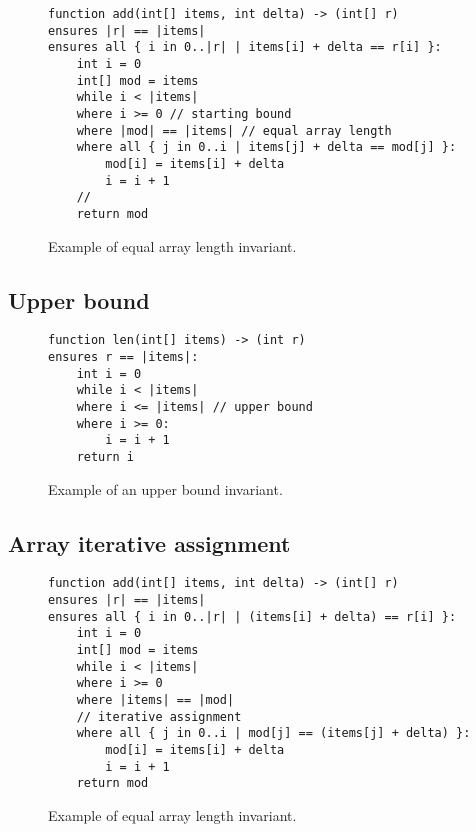 \begin{figure}[ht]
\begin{lstlisting}
function add(int[] items, int delta) -> (int[] r)
ensures |r| == |items|
ensures all { i in 0..|r| | items[i] + delta == r[i] }:
    int i = 0
    int[] mod = items
    while i < |items|
    where i >= 0 // starting bound
    where |mod| == |items| // equal array length
    where all { j in 0..i | items[j] + delta == mod[j] }:
        mod[i] = items[i] + delta
        i = i + 1
    //
    return mod
\end{lstlisting}
\caption{Example of equal array length invariant.}
\label{lst:starting-bound-rev}
\end{figure}

\subsection{Upper bound}



\begin{figure}[ht]
\begin{lstlisting}
function len(int[] items) -> (int r)
ensures r == |items|:
    int i = 0
    while i < |items|
    where i <= |items| // upper bound
    where i >= 0:
        i = i + 1
    return i
\end{lstlisting}
\caption{Example of an upper bound invariant.}
\label{lst:starting-bound-rev}
\end{figure}
 

\subsection{Array iterative assignment}


\begin{figure}[ht]
\begin{lstlisting}
function add(int[] items, int delta) -> (int[] r)
ensures |r| == |items|
ensures all { i in 0..|r| | (items[i] + delta) == r[i] }:
    int i = 0
    int[] mod = items
    while i < |items|
    where i >= 0
    where |items| == |mod|
    // iterative assignment
    where all { j in 0..i | mod[j] == (items[j] + delta) }:
        mod[i] = items[i] + delta
        i = i + 1
    return mod
\end{lstlisting}
\caption{Example of equal array length invariant.}
\label{lst:starting-bound-rev}
\end{figure}

